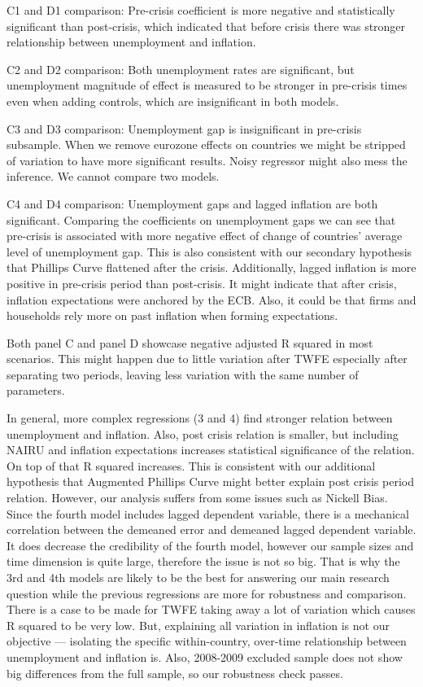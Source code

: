 \documentclass[preprint,10pt,authoryear]{elsarticle}
\begin{document}
C1 and D1 comparison: Pre-crisis coefficient is more negative and statistically significant than post-crisis, which indicated that before crisis there was stronger relationship between unemployment and inflation.

C2 and D2 comparison: Both unemployment rates are significant, but unemployment magnitude of effect is measured to be stronger in pre-crisis times even when adding controls, which are insignificant in both models.

C3 and D3 comparison: Unemployment gap is insignificant in pre-crisis subsample. When we remove eurozone effects on countries we might be stripped of variation to have more significant results. Noisy regressor might also mess the inference. We cannot compare two models. 

C4 and D4 comparison: Unemployment gaps and lagged inflation are both significant. Comparing the coefficients on unemployment gaps we can see that pre-crisis is associated with more negative effect of change of countries’ average level of unemployment gap. This is also consistent with our secondary hypothesis that Phillips Curve flattened after the crisis. Additionally, lagged inflation is more positive in pre-crisis period than post-crisis. It might indicate that after crisis, inflation expectations were anchored by the ECB. Also, it could be that firms and households rely more on past inflation when forming expectations. 

Both panel C and panel D showcase negative adjusted R squared in most scenarios. This might happen due to little variation after TWFE especially after separating two periods, leaving less variation with the same number of parameters.  

In general, more complex regressions (3 and 4) find stronger relation between unemployment and inflation. Also, post crisis relation is smaller, but including NAIRU and inflation expectations increases statistical significance of the relation. On top of that R squared increases. This is consistent with our additional hypothesis that Augmented Phillips Curve might better explain post crisis period relation. 
However, our analysis suffers from some issues such as Nickell Bias. Since the fourth model includes lagged dependent variable, there is a mechanical correlation between the demeaned error and demeaned lagged dependent variable. It does decrease the credibility of the fourth model, however our sample sizes and time dimension is quite large, therefore the issue is not so big. That is why the 3rd and 4th models are likely to be the best for answering our main research question while the previous regressions are more for robustness and comparison. There is a case to be made for TWFE taking away a lot of variation which causes R squared to be very low. But, explaining all variation in inflation is not our objective — isolating the specific within-country, over-time relationship between unemployment and inflation is. Also, 2008-2009 excluded sample does not show big differences from the full sample, so our robustness check passes.
\end{document}
